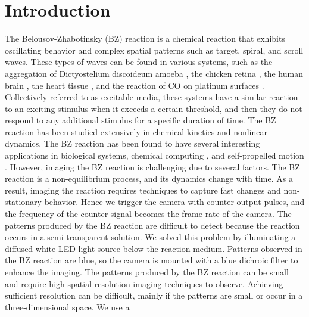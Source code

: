 \documentclass[journal=jacsat,manuscript=article]{achemso}
\begin{document}
\section{Introduction}
The Belousov-Zhabotinsky (BZ) reaction is a chemical reaction that
exhibits oscillating behavior and complex spatial patterns such as
target, spiral, and scroll waves. These types of waves can be found in
various systems, such as the aggregation of Dictyostelium discoideum
amoeba \cite{tan2020topological}, the chicken retina
\cite{yu2012reentrant}, the human brain \cite{rostami2018defects}, the
heart tissue \cite{lebert2023reconstruction}, and the reaction of CO
on platinum surfaces \cite{bhattacharya2019controlling}.  Collectively
referred to as excitable media, these systems have a similar
reaction to an exciting stimulus when it exceeds a certain threshold,
and then they do not respond to any additional stimulus for a specific
duration of time. The BZ reaction has been studied extensively in chemical kinetics and
nonlinear dynamics. The BZ reaction has been found to have several
interesting applications in biological systems, chemical computing
\cite{steinbock1996chemical}\cite{gruenert2013multi}, and
self-propelled motion
\cite{kumar2021fast}\cite{suematsu2018evolution}.
However, imaging the BZ reaction is challenging due to several
factors. The BZ reaction is a non-equilibrium process, and its
dynamics change with time. As a result, imaging the reaction requires
techniques to capture fast changes and non-stationary behavior. Hence
we trigger the camera with counter-output pulses, and the frequency of
the counter signal becomes the frame rate of the camera. The patterns
produced by the BZ reaction are difficult to detect because the
reaction occurs in a semi-transparent solution. We solved this problem
by illuminating a diffused white LED light source below the reaction
medium. Patterns observed in the BZ reaction are blue, so the
camera is mounted with a blue dichroic filter to enhance the
imaging. The patterns produced by the BZ reaction can be small and
require high spatial-resolution imaging techniques to
observe. Achieving sufficient resolution can be difficult, mainly if
the patterns are small or occur in a three-dimensional space. We use a
\end{document}
